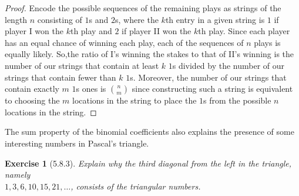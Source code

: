 \documentclass[12pt]{article}
\theoremstyle{plain}
\newtheorem{ex}{Exercise}
\begin{document}
\begin{proof}
  Encode the possible sequences of the remaining plays as strings of the length $n$ consisting of $1$s and $2$s, where the $k$th entry in a given string is $1$ if player I won the $k$th play and $2$ if player II won the $k$th play. Since each player has an equal chance of winning each play, each of the sequences of $n$ plays is equally likely. So,the ratio of I's winning the stakes to that of II's winning is the number of our strings that contain at least $k$ $1$s divided by the number of our strings that contain fewer than $k$ $1$s. Moreover, the number of our strings that contain exactly $m$ $1$s ones is $\binom{n}{m}$ since constructing such a string is equivalent to choosing the $m$ locations in the string to place the $1$s from the possible $n$ locations in the string.
\end{proof}

The sum property of the binomial coefficients also explains the presence of some interesting numbers in Pascal's triangle.

\begin{ex} [5.8.3]
  Explain why the third diagonal from the left in the triangle, namely \\
  $1,3,6,10,15,21,\ldots$, consists of the triangular numbers.
\end{ex}
\end{document}
